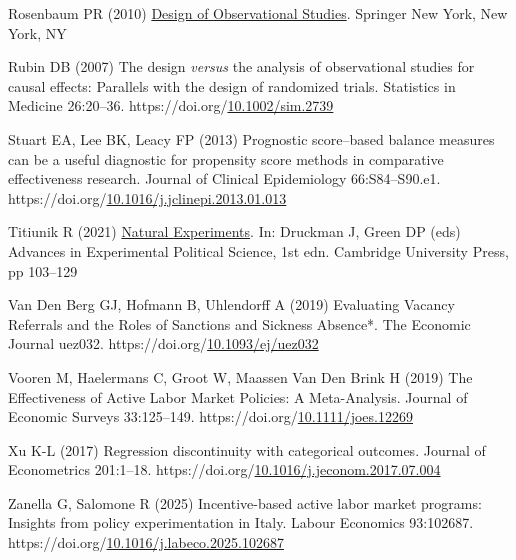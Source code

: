 \documentclass[
  11pt]{article}
\newlength{\cslhangindent}
\newenvironment{CSLReferences}[2] %
 {\begin{list}{}{%
  \setlength{\itemindent}{0pt}
  \setlength{\leftmargin}{0pt}
  \setlength{\parsep}{0pt}
  \ifodd #1
   \setlength{\leftmargin}{\cslhangindent}
   \setlength{\itemindent}{-1\cslhangindent}
  \fi
  \setlength{\itemsep}{#2\baselineskip}}}
 {\end{list}}
\begin{document}
\begin{CSLReferences}{1}{1}
Rosenbaum PR (2010)
\href{https://doi.org/10.1007/978-1-4419-1213-8}{Design of
{Observational Studies}}. Springer New York, New York, NY

Rubin DB (2007) The design {\emph{versus}} the analysis of observational
studies for causal effects: Parallels with the design of randomized
trials. Statistics in Medicine 26:20--36.
https://doi.org/\href{https://doi.org/10.1002/sim.2739}{10.1002/sim.2739}

Stuart EA, Lee BK, Leacy FP (2013) Prognostic score--based balance
measures can be a useful diagnostic for propensity score methods in
comparative effectiveness research. Journal of Clinical Epidemiology
66:S84--S90.e1.
https://doi.org/\href{https://doi.org/10.1016/j.jclinepi.2013.01.013}{10.1016/j.jclinepi.2013.01.013}

Titiunik R (2021)
\href{https://doi.org/10.1017/9781108777919.008}{Natural {Experiments}}.
In: Druckman J, Green DP (eds) Advances in {Experimental Political
Science}, 1st edn. Cambridge University Press, pp 103--129

Van Den Berg GJ, Hofmann B, Uhlendorff A (2019) Evaluating {Vacancy
Referrals} and the {Roles} of {Sanctions} and {Sickness Absence}*. The
Economic Journal uez032.
https://doi.org/\href{https://doi.org/10.1093/ej/uez032}{10.1093/ej/uez032}

Vooren M, Haelermans C, Groot W, Maassen Van Den Brink H (2019) The
{Effectiveness} of {Active Labor Market Policies}: {A Meta}-{Analysis}.
Journal of Economic Surveys 33:125--149.
https://doi.org/\href{https://doi.org/10.1111/joes.12269}{10.1111/joes.12269}

Xu K-L (2017) Regression discontinuity with categorical outcomes.
Journal of Econometrics 201:1--18.
https://doi.org/\href{https://doi.org/10.1016/j.jeconom.2017.07.004}{10.1016/j.jeconom.2017.07.004}

Zanella G, Salomone R (2025) Incentive-based active labor market
programs: {Insights} from policy experimentation in {Italy}. Labour
Economics 93:102687.
https://doi.org/\href{https://doi.org/10.1016/j.labeco.2025.102687}{10.1016/j.labeco.2025.102687}

\end{CSLReferences}
\end{document}
